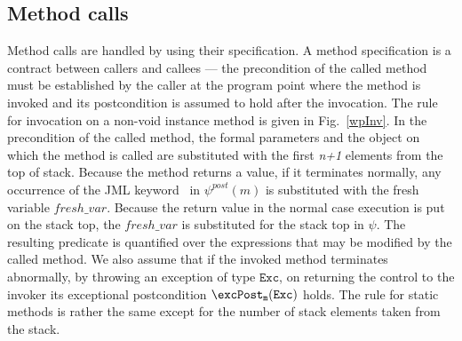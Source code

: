 \subsection{Method calls}
Method calls are handled by using their specification. A method specification is a contract between callers and callees --- the precondition of the called method
must be established by the caller at the program point where the method is invoked and its postcondition is assumed to hold after the invocation. The rule for
invocation on a non-void instance method is given in Fig.~\ref{wpInv}. In the precondition of the called method, the formal parameters and the object on which the method is called are substituted with the first \textit{n+1} elements from the top of stack. 
Because the method returns a value, if it terminates normally, any occurrence of the JML keyword \result \ in $\psi^{post}(m)$ is substituted with the fresh variable $fresh\_var$.  
Because the return value in the normal case execution is put on the stack top, the $fresh\_var$ is substituted for the stack top in $\psi$. The resulting predicate is quantified over the expressions that may be modified by the called method. We also assume that if the invoked method terminates abnormally, by throwing an exception of type $\texttt{Exc}$, on returning the control to the invoker its exceptional postcondition $\excPost_{\tt{m} }( \tt{Exc} )$ holds. 
The rule for static methods is rather the same except for the number of stack elements taken from the stack.  
